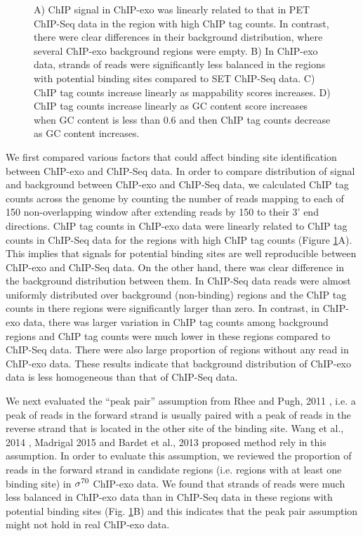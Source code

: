 \documentclass[11pt]{article}\usepackage[]{graphicx}\usepackage[]{color}
\begin{document}
\begin{figure}[H]
  \caption{ A) ChIP signal in ChIP-exo was linearly related to that in
    PET ChIP-Seq data in the region with high ChIP tag counts. In
    contrast, there were clear differences in their background
    distribution, where several ChIP-exo background regions were
    empty. B) In ChIP-exo data, strands of reads were significantly
    less balanced in the regions with potential binding sites compared
    to SET ChIP-Seq data. C) ChIP tag counts increase linearly as
    mappability scores increases. D) ChIP tag counts increase linearly
    as GC content score increases when GC content is less than 0.6 and
    then ChIP tag counts decrease as GC content increases. }
  \label{fig:comp}
\end{figure}



We first compared various factors that could affect binding site
identification between ChIP-exo and ChIP-Seq data. In order to compare
distribution of signal and background between ChIP-exo and ChIP-Seq
data, we calculated ChIP tag counts across the genome by counting the
number of reads mapping to each of 150 non-overlapping
window after extending reads by 150 to their 3' end
directions. ChIP tag counts in ChIP-exo data were linearly related to
ChIP tag counts in ChIP-Seq data for the regions with high ChIP tag
counts (Figure \ref{fig:comp}A). This implies that signals for
potential binding sites are well reproducible between ChIP-exo and
ChIP-Seq data. On the other hand, there was clear difference in the
background distribution between them. In ChIP-Seq data reads were
almost uniformly distributed over background (non-binding) regions and
the ChIP tag counts in there regions were significantly larger than
zero. In contrast, in ChIP-exo data, there was larger variation in
ChIP tag counts among background regions and ChIP tag counts were much
lower in these regions compared to ChIP-Seq data. There were also
large proportion of regions without any read in ChIP-exo data. These
results indicate that background distribution of ChIP-exo data is less
homogeneous than that of ChIP-Seq data.

We next evaluated the ``peak pair'' assumption from Rhee and Pugh,
2011 \cite{exo1}, i.e. a peak of reads in the forward strand is
usually paired with a peak of reads in the reverse strand that is
located in the other site of the binding site. Wang et al., 2014
\cite{mace}, Madrigal 2015 \cite{cexor} and Bardet et al., 2013
\cite{peakzilla} proposed method rely in this assumption. In order to
evaluate this assumption, we reviewed the proportion of reads in the
forward strand in candidate regions (i.e. regions with at least one
binding site) in $\sigma^{70}$ ChIP-exo data. We found that strands of reads
were much less balanced in ChIP-exo data than in ChIP-Seq data in
these regions with potential binding sites (Fig. \ref{fig:comp}B) and
this indicates that the peak pair assumption might not hold in real
ChIP-exo data.
\end{document}
